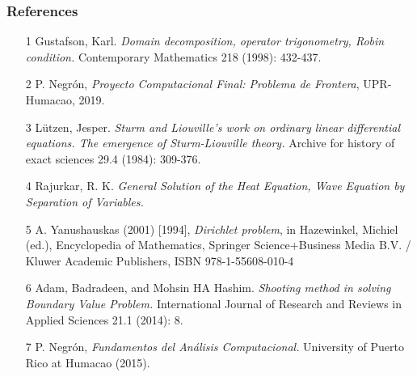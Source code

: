 \documentclass{beamer}
\begin{document}
\begin{frame}
\frametitle{References}
 {\ssmall
 \begin{itemize}
    \item [1] Gustafson, Karl. \textit{Domain decomposition, operator trigonometry, Robin condition.} Contemporary Mathematics 218 (1998): 432-437.
    \item [2] P. Negr\'{o}n, \textit{Proyecto Computacional Final: Problema de Frontera}, UPR-Humacao, 2019. 
    \item [3] L\"{u}tzen, Jesper. \textit{Sturm and Liouville's work on ordinary linear differential equations. The emergence of Sturm-Liouville theory.} Archive for history of exact sciences 29.4 (1984): 309-376.
    \item [4] Rajurkar, R. K. \textit{General Solution of the Heat Equation, Wave Equation by Separation of Variables.}
    \item [5] A. Yanushauskas (2001) [1994], \textit{Dirichlet problem}, in Hazewinkel, Michiel (ed.), Encyclopedia of Mathematics, Springer Science+Business Media B.V. / Kluwer Academic Publishers, ISBN 978-1-55608-010-4
    \item [6] Adam, Badradeen, and Mohsin HA Hashim. \textit{Shooting method in solving Boundary Value Problem.} International Journal of Research and Reviews in Applied Sciences 21.1 (2014): 8.
    \item [7] P. Negr\'{o}n, \textit{Fundamentos del An\'{a}lisis Computacional.} University of Puerto Rico at Humacao (2015).
\end{itemize}
}
\end{frame}
\end{document}
